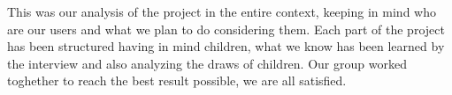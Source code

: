 \documentclass[12pt]{report}
\begin{document}
	 This was our analysis of the project in the entire context, keeping in mind who are our users and what we
	 plan to do considering them. Each part of the project has been structured having in mind children, what we
	 know has been learned by the interview and also analyzing the draws of children. Our group worked toghether
	 to reach the best result possible, we are all satisfied.














	
\end{document}
